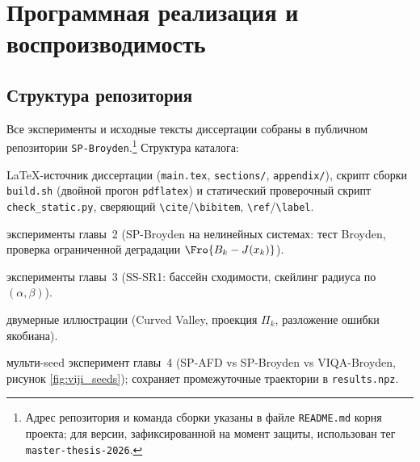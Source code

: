 
\chapter{Программная реализация и воспроизводимость}
\label{ch:reproducibility}

\section{Структура репозитория}

Все эксперименты и исходные тексты диссертации собраны в публичном
репозитории \texttt{SP-Broyden}.\footnote{Адрес репозитория и команда
сборки указаны в файле \texttt{README.md} корня проекта; для версии,
зафиксированной на момент защиты, использован тег \texttt{master-thesis-2026}.}
Структура каталога:
\begin{description}\itemsep0pt
  \item[\texttt{mipt\_thesis\_master/}] \LaTeX-источник диссертации
        (\texttt{main.tex}, \texttt{sections/}, \texttt{appendix/}),
        скрипт сборки \texttt{build.sh} (двойной прогон \texttt{pdflatex})
        и статический проверочный скрипт \texttt{check\_static.py},
        сверяющий \verb|\cite|/\verb|\bibitem|, \verb|\ref|/\verb|\label|.
  \item[\texttt{tezisy.ipynb}] эксперименты главы~2 (SP-Broyden на
        нелинейных системах: тест Broyden, проверка ограниченной
        деградации $\Fro{B_k - J(x_k)}$).
  \item[\texttt{basin.ipynb}] эксперименты главы~3 (SS-SR1: бассейн
        сходимости, скейлинг радиуса по $(\alpha,\beta)$).
  \item[\texttt{pics.ipynb}] двумерные иллюстрации (Curved Valley,
        проекция $\Pi_k$, разложение ошибки якобиана).
  \item[\texttt{run\_seeds.py}] мульти-seed эксперимент главы~4
        (SP-AFD vs SP-Broyden vs VIQA-Broyden, рисунок
        \ref{fig:viji_seeds}); сохраняет промежуточные траектории
        в \texttt{results.npz}.
\end{description}

